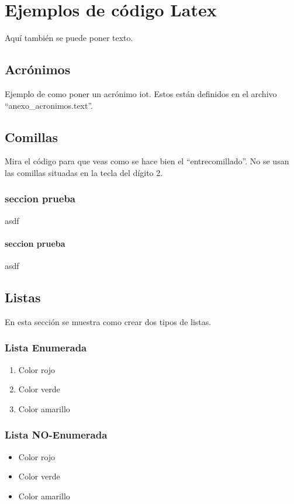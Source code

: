 \chapter{Ejemplos de código Latex}
\label{ch:codigos_ejemplo}
Aquí también se puede poner texto.

\section{Acrónimos}
Ejemplo de como poner un acrónimo \acrshort{iot}. Estos están definidos en el archivo ``anexo\_acronimos.text''.


\section{Comillas}
Mira el código para que veas como se hace bien el ``entrecomillado''. No se usan las comillas situadas en la tecla del dígito 2.

\subsection{seccion prueba}
asdf

\subsubsection{seccion prueba}
asdf

\section{Listas}
En esta sección se muestra como crear dos tipos de listas.

\subsection{Lista Enumerada}
\begin{enumerate}
\item Color rojo
\item Color verde
\item Color amarillo
\end{enumerate}



\subsection{Lista NO-Enumerada}
\begin{itemize}
\item Color rojo
\item Color verde
\item Color amarillo
\end{itemize}

